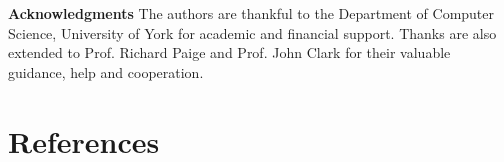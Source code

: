 \documentclass[runningheads,a4paper]{llncs}
\begin{document}



\bigskip

















\noindent\textbf{Acknowledgments} The authors are thankful to the Department of Computer Science, University of York for academic and financial support. %
Thanks are also extended to Prof. Richard Paige and Prof. John Clark for their valuable guidance, help and cooperation.




\section*{References}
\renewcommand\refname{}
\vspace*{-0.7cm}


\end{document}
